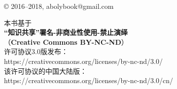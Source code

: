 \thispagestyle{empty}

\begin{center}
© 2016--2018, abolybook@gmail.com
\medskip

本书基于\\
\textbf{“知识共享”署名-非商业性使用-禁止演绎}\\
（\textbf{Creative Commons BY-NC-ND}）\\
许可协议3.0版发布：\\
https://creativecommons.org/licenses/by-nc-nd/3.0/\\
该许可协议的中国大陆版：\\
https://creativecommons.org/licenses/by-nc-nd/3.0/cn/
\end{center}
